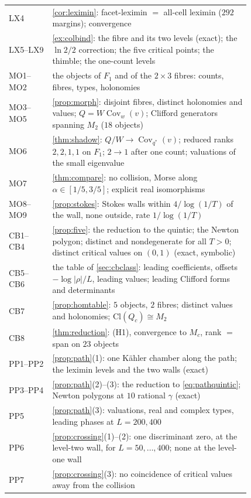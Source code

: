 \documentclass[11pt]{article}
\theoremstyle{definition}\newtheorem{definition}[theorem]{Definition}\newtheorem{remark}[theorem]{Remark}\newtheorem{example}[theorem]{Example}\newtheorem{problem}[theorem]{Open problem}\crefname{problem}{Problem}{Problems}
\begin{document}
{\begin{longtable}{lp{0.82\linewidth}}
LX4 & \cref{cor:leximin}: facet-leximin $=$ all-cell leximin ($292$ margins); convergence\\
LX5--LX9 & \cref{ex:colbind}: the fibre and its two levels (exact); the $\ln2/2$ correction; the five critical points; the thimble; the one-count levels\\
MO1--MO2 & the objects of $F_1$ and of the $2\times3$ fibres: counts, fibres, types, holonomies\\
MO3--MO5 & \cref{prop:morph}: disjoint fibres, distinct holonomies and values; $Q=W\operatorname{Cov}_w(v)$; Clifford generators spanning $M_2$ ($18$ objects)\\
MO6 & \cref{thm:shadow}: $Q/W\to\operatorname{Cov}_{q^*}(v)$; reduced ranks $2,2,1,1$ on $F_1$; $2\to1$ after one count; valuations of the small eigenvalue\\
MO7 & \cref{thm:compare}: no collision, Morse along $\alpha\in[1/5,3/5]$; explicit real isomorphisms\\
MO8--MO9 & \cref{prop:stokes}: Stokes walls within $4/\log(1/T)$ of the wall, none outside, rate $1/\log(1/T)$\\
CB1--CB4 & \cref{prop:five}: the reduction to the quintic; the Newton polygon; distinct and nondegenerate for all $T>0$; distinct critical values on $(0,1)$ (exact, symbolic)\\
CB5--CB6 & the table of \cref{sec:cbclass}: leading coefficients, offsets $-\log|\rho|/L$, leading values; leading Clifford forms and determinants\\
CB7 & \cref{prop:homtable}: $5$ objects, $2$ fibres; distinct values and holonomies; $\mathrm{Cl}(Q_c)\cong M_2$\\
CB8 & \cref{thm:reduction}: (H1), convergence to $M_c$, rank $=$ span on $23$ objects\\
PP1--PP2 & \cref{prop:path}(1): one K\"ahler chamber along the path; the leximin levels and the two walls (exact)\\
PP3--PP4 & \cref{prop:path}(2)--(3): the reduction to \eqref{eq:pathquintic}; Newton polygons at $10$ rational $\gamma$ (exact)\\
PP5 & \cref{prop:path}(3): valuations, real and complex types, leading phases at $L=200,400$\\
PP6 & \cref{prop:crossing}(1)--(2): one discriminant zero, at the level-two wall, for $L=50,\dots,400$; none at the level-one wall\\
PP7 & \cref{prop:crossing}(3): no coincidence of critical values away from the collision\\

\end{longtable}}
\end{document}
